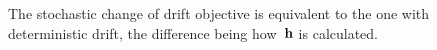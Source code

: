 The stochastic change of drift objective is equivalent to the one with deterministic drift, the difference being how~$\boldsymbol{\mathrm{h}}$ is calculated.


